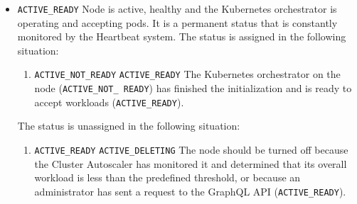 \begin{itemize}
\begin{itemize}
      \item \texttt{ACTIVE\_READY}
        \newline
        Node is active, healthy and the Kubernetes orchestrator is operating and
        accepting pods.
        \newline
        It is a permanent status that is constantly monitored by the Heartbeat
        system.
        \newline
        The status is assigned in the following situation:
        \begin{enumerate}
          \item \texttt{ACTIVE\_NOT\_READY}  \texttt{ACTIVE\_READY}
            \newline
            The Kubernetes orchestrator on the node (\texttt{ACTIVE\_NOT\_ READY})
            has finished the initialization and is ready to accept workloads (\texttt{ACTIVE\_READY}).
        \end{enumerate}
        The status is unassigned in the following situation:
        \begin{enumerate}
          \item \texttt{ACTIVE\_READY}  \texttt{ACTIVE\_DELETING}
            \newline
            The node should be turned off because the Cluster Autoscaler has
            monitored it and determined that its overall workload is less than
            the predefined threshold, or because an administrator has sent a request
            to the GraphQL API (\texttt{ACTIVE\_READY}).
        \end{enumerate}


\end{itemize}
\end{itemize}
